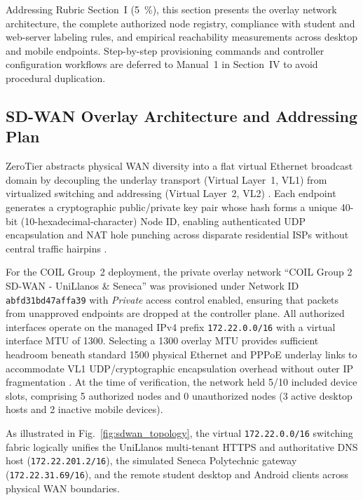Addressing Rubric Section~I (\qty{5}{\percent}), this section presents the overlay network architecture, the complete authorized node registry, compliance with student and web-server labeling rules, and empirical reachability measurements across desktop and mobile endpoints. Step-by-step provisioning commands and controller configuration workflows are deferred to Manual~1 in Section~IV to avoid procedural duplication.

\subsection{SD-WAN Overlay Architecture and Addressing Plan}
\label{subsec:sdwan_architecture}

ZeroTier abstracts physical WAN diversity into a flat virtual Ethernet broadcast domain by decoupling the underlay transport (Virtual Layer~1, VL1) from virtualized switching and addressing (Virtual Layer~2, VL2) \cite{zerotier2024}. Each endpoint generates a cryptographic public/private key pair whose hash forms a unique 40-bit (10-hexadecimal-character) Node ID, enabling authenticated UDP encapsulation and NAT hole punching across disparate residential ISPs without central traffic hairpins \cite{zerotier2024,kurose2017}.

For the COIL Group~2 deployment, the private overlay network ``COIL Group 2 SD-WAN - UniLlanos \& Seneca'' was provisioned under Network ID \texttt{abfd31bd47affa39} with \textit{Private} access control enabled, ensuring that packets from unapproved endpoints are dropped at the controller plane. All authorized interfaces operate on the managed IPv4 prefix \texttt{172.22.0.0/16} with a virtual interface MTU of \qty{1300}{\byte}. Selecting a \qty{1300}{\byte} overlay MTU provides sufficient headroom beneath standard \qty{1500}{\byte} physical Ethernet and PPPoE underlay links to accommodate VL1 UDP/cryptographic encapsulation overhead without outer IP fragmentation \cite{tanenbaum2021,zerotier2024}. At the time of verification, the network held \num{5}/\num{10} included device slots, comprising \num{5} authorized nodes and \num{0} unauthorized nodes (\num{3} active desktop hosts and \num{2} inactive mobile devices).



As illustrated in Fig.~\ref{fig:sdwan_topology}, the virtual \texttt{172.22.0.0/16} switching fabric logically unifies the UniLlanos multi-tenant HTTPS and authoritative DNS host (\texttt{172.22.201.2/16}), the simulated Seneca Polytechnic gateway (\texttt{172.22.31.69/16}), and the remote student desktop and Android clients across physical WAN boundaries.

